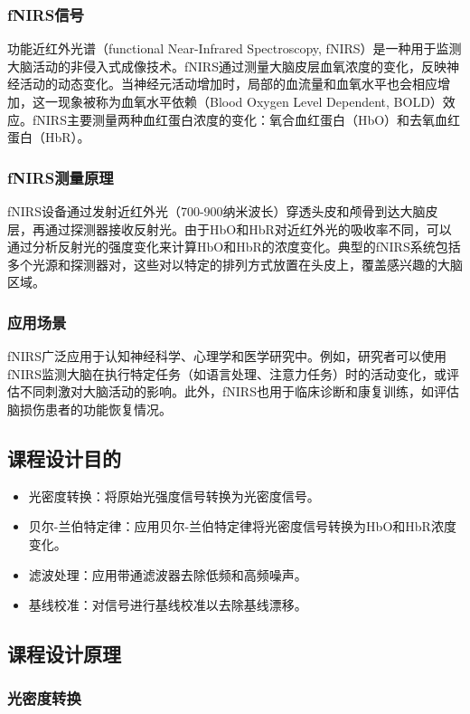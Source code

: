 \documentclass[a4paper,12pt]{article}
\begin{document}
\subsubsection{fNIRS信号}
功能近红外光谱（functional Near-Infrared Spectroscopy, fNIRS）是一种用于监测大脑活动的非侵入式成像技术。fNIRS通过测量大脑皮层血氧浓度的变化，反映神经活动的动态变化。当神经元活动增加时，局部的血流量和血氧水平也会相应增加，这一现象被称为血氧水平依赖（Blood Oxygen Level Dependent, BOLD）效应。fNIRS主要测量两种血红蛋白浓度的变化：氧合血红蛋白（HbO）和去氧血红蛋白（HbR）。

\subsubsection{fNIRS测量原理}
fNIRS设备通过发射近红外光（700-900纳米波长）穿透头皮和颅骨到达大脑皮层，再通过探测器接收反射光。由于HbO和HbR对近红外光的吸收率不同，可以通过分析反射光的强度变化来计算HbO和HbR的浓度变化。典型的fNIRS系统包括多个光源和探测器对，这些对以特定的排列方式放置在头皮上，覆盖感兴趣的大脑区域。

\subsubsection{应用场景}
fNIRS广泛应用于认知神经科学、心理学和医学研究中。例如，研究者可以使用fNIRS监测大脑在执行特定任务（如语言处理、注意力任务）时的活动变化，或评估不同刺激对大脑活动的影响。此外，fNIRS也用于临床诊断和康复训练，如评估脑损伤患者的功能恢复情况。

\subsection{课程设计目的}
\begin{itemize}
    \item 光密度转换：将原始光强度信号转换为光密度信号。
    \item 贝尔-兰伯特定律：应用贝尔-兰伯特定律将光密度信号转换为HbO和HbR浓度变化。
    \item 滤波处理：应用带通滤波器去除低频和高频噪声。
    \item 基线校准：对信号进行基线校准以去除基线漂移。
\end{itemize}

\subsection{课程设计原理}
\subsubsection{光密度转换}
\end{document}
